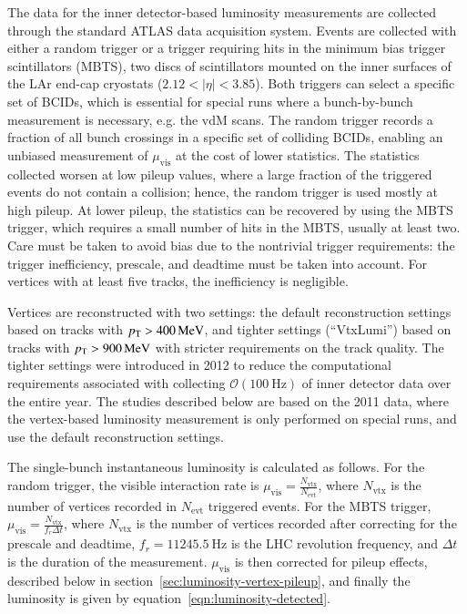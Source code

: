 The data for the inner detector-based luminosity measurements are collected through the standard ATLAS data acquisition system. Events are collected with either a random trigger or a trigger requiring hits in the minimum bias trigger scintillators (MBTS), two discs of scintillators mounted on the inner surfaces of the LAr end-cap cryostats ($2.12<|\eta|<3.85$). Both triggers can select a specific set of BCIDs, which is essential for special runs where a bunch-by-bunch measurement is necessary, e.g. the vdM scans. The random trigger records a fraction of all bunch crossings in a specific set of colliding BCIDs, enabling an unbiased measurement of $\mu_{\mathrm{vis}}$ at the cost of lower statistics. The statistics collected worsen at low pileup values, where a large fraction of the triggered events do not contain a collision; hence, the random trigger is used mostly at high pileup. At lower pileup, the statistics can be recovered by using the MBTS trigger, which requires a small number of hits in the MBTS, usually at least two. Care must be taken to avoid bias due to the nontrivial trigger requirements: the trigger inefficiency, prescale, and deadtime must be taken into account. For vertices with at least five tracks, the inefficiency is negligible. 

Vertices are reconstructed with two settings: the default reconstruction settings based on tracks with $p_{\text{T}}>\SI{400}{\mega\electronvolt}$, and tighter settings (``VtxLumi'') based on tracks with $p_{\text{T}}>\SI{900}{\mega\electronvolt}$ with stricter requirements on the track quality. The tighter settings were introduced in 2012 to reduce the computational requirements associated with collecting $\mathcal{O}(\SI{100}{\hertz})$ of inner detector data over the entire year. The studies described below are based on the 2011 data, where the vertex-based luminosity measurement is only performed on special runs, and use the default reconstruction settings.

The single-bunch instantaneous luminosity is calculated as follows. For the random trigger, the visible interaction rate is $\mu_{\mathrm{vis}}=\frac{N_{\mathrm{vtx}}}{N_{\mathrm{evt}}}$, where $N_{\mathrm{vtx}}$ is the number of vertices recorded in $N_{\mathrm{evt}}$ triggered events. For the MBTS trigger, $\mu_{\mathrm{vis}}=\frac{N_{\mathrm{vtx}}}{f_r \Delta t}$, where $N_{\mathrm{vtx}}$ is the number of vertices recorded after correcting for the prescale and deadtime, $f_r=\SI{11245.5}{\hertz}$ is the LHC revolution frequency, and $\Delta t$ is the duration of the measurement. $\mu_{\mathrm{vis}}$ is then corrected for pileup effects, described below in section~\ref{sec:luminosity-vertex-pileup}, and finally the luminosity is given by equation~\ref{eqn:luminosity-detected}.


